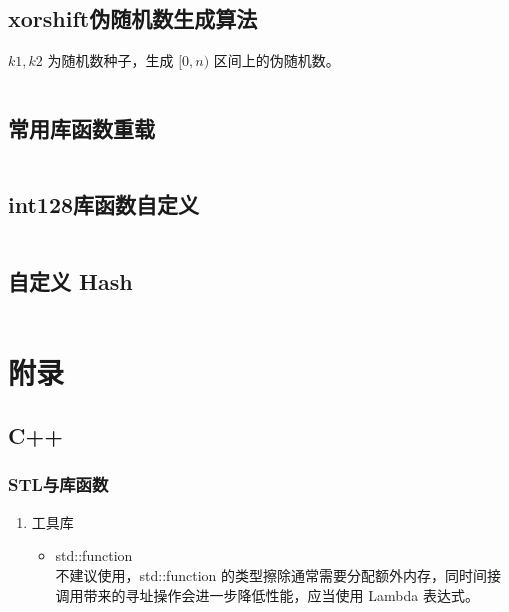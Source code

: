 \documentclass[a4paper, twoside]{article}
\begin{document}
\subsection{xorshift伪随机数生成算法}
$k1, k2$ 为随机数种子，生成 $[0, n)$ 区间上的伪随机数。
\inputminted{cpp}{../src/杂项/xorshift伪随机数生成算法.cpp}

\subsection{常用库函数重载}
\inputminted{cpp}{../src/杂项/常用库函数重载.cpp}

\subsection{int128库函数自定义}
\inputminted{cpp}{../src/杂项/int128库函数自定义.cpp}

\subsection{自定义 Hash}
\inputminted{cpp}{../src/杂项/自定义Hash.cpp}

\newpage
\section{附录}
\subsection{C++}
    \subsubsection{STL与库函数}
    \begin{enumerate}
        \item 工具库
        \begin{itemize}
            \item std::function\\
            不建议使用，std::function 的类型擦除通常需要分配额外内存，同时间接调用带来的寻址操作会进一步降低性能，应当使用 Lambda 表达式。
            \inputminted{cpp}{../src/附录/C++/std::function.cpp}
        \end{itemize}
    \end{enumerate}
\end{document}
